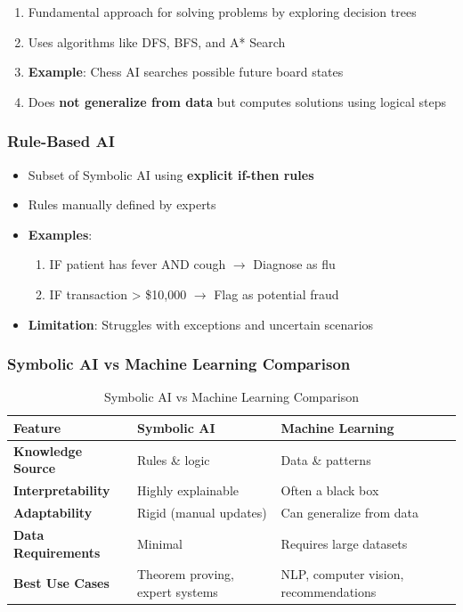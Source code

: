 \begin{enumerate}
\item Fundamental approach for solving problems by exploring decision trees
\item Uses algorithms like DFS, BFS, and A* Search
\item \textbf{Example}: Chess AI searches possible future board states
\item Does \textbf{not generalize from data} but computes solutions using logical steps
\end{enumerate}

\subsubsection{Rule-Based AI}
\label{subsubsec:rule-based-ai}

\begin{itemize}
\item Subset of Symbolic AI using \textbf{explicit if-then rules}
\item Rules manually defined by experts
\item \textbf{Examples}:
\begin{enumerate}
\item IF patient has fever AND cough $\rightarrow$ Diagnose as flu
\item IF transaction > \$10,000 $\rightarrow$ Flag as potential fraud
\end{enumerate}
\item \textbf{Limitation}: Struggles with exceptions and uncertain scenarios
\end{itemize}

\subsubsection{Symbolic AI vs Machine Learning Comparison}
\label{subsubsec:symbolic-vs-ml-comparison}

\begin{table}[h!]
\centering
\begin{tabular}{|p{3cm}|p{4.5cm}|p{4.5cm}|}
\hline
\textbf{Feature} & \textbf{Symbolic AI} & \textbf{Machine Learning} \\
\hline
\textbf{Knowledge Source} & Rules \& logic & Data \& patterns \\
\hline
\textbf{Interpretability} & Highly explainable & Often a black box \\
\hline
\textbf{Adaptability} & Rigid (manual updates) & Can generalize from data \\
\hline
\textbf{Data Requirements} & Minimal & Requires large datasets \\
\hline
\textbf{Best Use Cases} & Theorem proving, expert systems & NLP, computer vision, recommendations \\
\hline
\end{tabular}
\caption{Symbolic AI vs Machine Learning Comparison}
\label{tab:symbolic-vs-ml}
\end{table}

